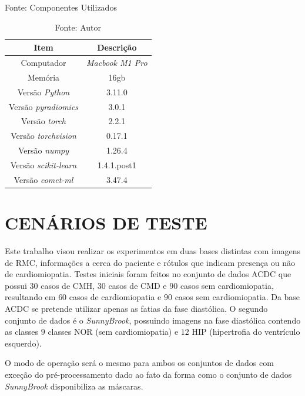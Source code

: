 \begin{table}[hbtp]
    \caption{Fonte: Componentes Utilizados}
    \centering
    \renewcommand{\arraystretch}{1} %
    \begin{tabular}{|c|c|}
    \hline 
       \textbf{Item} & \textbf{Descrição}\\
    \hline 
       Computador & \textit{Macbook M1 Pro}  \\
    \hline 
       Memória & 16gb  \\
    \hline 
       Versão \textit{Python} & 3.11.0  \\
    \hline 
       Versão \textit{pyradiomics} & 3.0.1 \\
    \hline 
       Versão \textit{torch} & 2.2.1 \\
    \hline 
       Versão \textit{torchvision} & 0.17.1 \\
    \hline 
       Versão \textit{numpy} & 1.26.4 \\
    \hline 
       Versão \textit{scikit-learn} & 1.4.1.post1 \\
    \hline 
       Versão \textit{comet-ml} & 3.47.4 \\
    \hline 
    \end{tabular} 
    \caption*{Fonte: Autor}
    \label{tab:hardware_software}
\end{table}

\section{CENÁRIOS DE TESTE} 
\label{subsec:cap5_dataset}

Este trabalho visou realizar os experimentos em duas bases distintas com imagens de \gls{RMC}, informações a cerca do paciente e rótulos que indicam presença ou não de cardiomiopatia. Testes iniciais foram feitos no conjunto de dados \gls{ACDC} que possui $30$ casos de \gls{CMH}, $30$ casos de \gls{CMD} e $90$ casos sem cardiomiopatia, resultando em $60$ casos de cardiomiopatia e $90$ casos sem cardiomiopatia. Da base \gls{ACDC} se pretende utilizar apenas as fatias da fase diastólica. O segundo conjunto de dados é o \textit{SunnyBrook}, possuindo imagens na fase diastólica contendo as classes $9$ classes NOR (sem cardiomiopatia) e $12$ HIP (hipertrofia do ventrículo esquerdo).

O modo de operação será o mesmo para ambos os conjuntos de dados com exceção do pré-processamento dado ao fato da forma como o conjunto de dados \textit{SunnyBrook} disponibiliza as máscaras.

